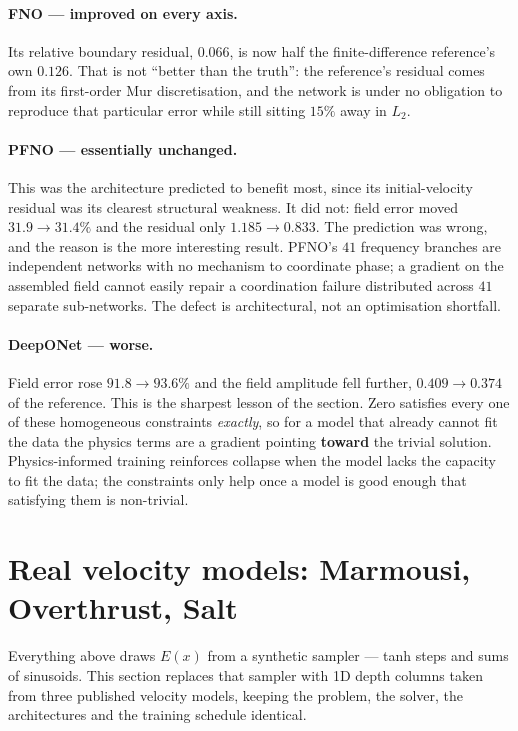 \documentclass[11pt,a4paper]{article}
\begin{document}
\paragraph{FNO --- improved on every axis.} Its relative boundary residual,
$0.066$, is now half the finite-difference reference's own $0.126$. That is not
``better than the truth'': the reference's residual comes from its first-order
Mur discretisation, and the network is under no obligation to reproduce that
particular error while still sitting $15\%$ away in $L_2$.

\paragraph{PFNO --- essentially unchanged.} This was the architecture predicted
to benefit most, since its initial-velocity residual was its clearest structural
weakness. It did not: field error moved $31.9\to31.4\%$ and the residual only
$1.185\to0.833$. The prediction was wrong, and the reason is the more
interesting result. PFNO's $41$ frequency branches are independent networks with
no mechanism to coordinate phase; a gradient on the assembled field cannot
easily repair a coordination failure distributed across $41$ separate
sub-networks. The defect is architectural, not an optimisation shortfall.

\paragraph{DeepONet --- worse.} Field error rose $91.8\to93.6\%$ and the field
amplitude fell further, $0.409\to0.374$ of the reference. This is the sharpest
lesson of the section. Zero satisfies every one of these homogeneous constraints
\emph{exactly}, so for a model that already cannot fit the data the physics terms
are a gradient pointing \textbf{toward} the trivial solution. Physics-informed
training reinforces collapse when the model lacks the capacity to fit the data;
the constraints only help once a model is good enough that satisfying them is
non-trivial.

\section{Real velocity models: Marmousi, Overthrust, Salt}\label{sec:real}

Everything above draws $E(x)$ from a synthetic sampler --- tanh steps and sums
of sinusoids. This section replaces that sampler with 1D depth columns taken
from three published velocity models, keeping the problem, the solver, the
architectures and the training schedule identical.
\end{document}
